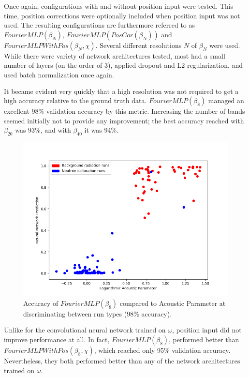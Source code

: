 \documentclass[10pt]{article}
\begin{document}
Once again, configurations with and without position input were tested. This time, position corrections were optionally included when position input was not used. The resulting configurations are furthermore referred to as $FourierMLP(\beta_{N})$, $FourierMLP(PosCor(\beta_{N}))$ and $FourierMLPWithPos(\beta_{N}, \chi)$. Several different resolutions $N$ of $\beta_{N}$ were used. While there were variety of network architectures tested, most had a small number of layers (on the order of 3), applied dropout and L2 regularization, and used batch normalization once again.

It became evident very quickly that a high resolution was not required to get a high accuracy relative to the ground truth data. $FourierMLP(\beta_{8})$ managed an excellent 98\% validation accuracy by this metric. Increasing the number of bands seemed initially not to provide any improvement; the best accuracy reached with $\beta_{20}$ was 93\%, and with $\beta_{40}$ it was 94\%.

\begin{figure}[h]
    \centering
    \includegraphics[width=\textwidth]{fourier_mlp_no_correction}
    \caption{\label{fourier_mlp_no_correction} Accuracy of $FourierMLP(\beta_{8})$ compared to Acoustic Parameter at discriminating between run types (98\% accuracy).}
\end{figure}

Unlike for the convolutional neural network trained on $\omega$, position input did not improve performance at all. In fact, $FourierMLP(\beta_{8})$, performed better than $FourierMLPWithPos(\beta_{8}, \chi)$, which reached only 95\% validation accuracy. Nevertheless, they both performed better than any of the network architectures trained on $\omega$.
\end{document}
